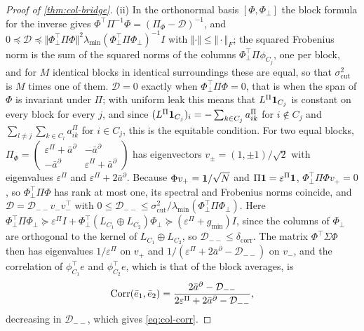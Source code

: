 \begin{proof}[Proof of \cref{thm:col-bridge}]
(ii) In the orthonormal basis $[\Phi,\Phi_\perp]$ the block formula for the inverse gives $\Phi^\top\Pi^{-1}\Phi=(\Pi_\Phi-\mathcal D)^{-1}$, and $0\preceq\mathcal D\preceq\Vert\Phi_\perp^\top\Pi\Phi\Vert^2\lambda_{\min}(\Phi_\perp^\top\Pi\Phi_\perp)^{-1}I$ with $\Vert\cdot\Vert\le\Vert\cdot\Vert_F$; the squared Frobenius norm is the sum of the squared norms of the columns $\Phi_\perp^\top\Pi\phi_{C_j}$, one per block, and for $M$ identical blocks in identical surroundings these are equal, so that $\sigma^2_{\mathrm{cut}}$ is $M$ times one of them. $\mathcal D=0$ exactly when $\Phi_\perp^\top\Pi\Phi=0$, that is when the span of $\Phi$ is invariant under $\Pi$; with uniform leak this means that $L^\Pi\mathbf{1}_{C_j}$ is constant on every block for every $j$, and since $(L^\Pi\mathbf{1}_{C_j})_i=-\sum_{k\in C_j}a^\Pi_{ik}$ for $i\notin C_j$ and $\sum_{l\neq j}\sum_{k\in C_l}a^\Pi_{ik}$ for $i\in C_j$, this is the equitable condition. For two equal blocks, $\Pi_\Phi=\begin{pmatrix}\varepsilon^\Pi+\bar a^\partial&-\bar a^\partial\\-\bar a^\partial&\varepsilon^\Pi+\bar a^\partial\end{pmatrix}$ has eigenvectors $v_\pm=(1,\pm1)/\sqrt2$ with eigenvalues $\varepsilon^\Pi$ and $\varepsilon^\Pi+2\bar a^\partial$. Because $\Phi v_+=\mathbf{1}/\sqrt N$ and $\Pi\mathbf{1}=\varepsilon^\Pi\mathbf{1}$, $\Phi_\perp^\top\Pi\Phi v_+=0$, so $\Phi_\perp^\top\Pi\Phi$ has rank at most one, its spectral and Frobenius norms coincide, and $\mathcal D=\mathcal D_{--}v_-v_-^\top$ with $0\le\mathcal D_{--}\le\sigma^2_{\mathrm{cut}}/\lambda_{\min}(\Phi_\perp^\top\Pi\Phi_\perp)$. Here $\Phi_\perp^\top\Pi\Phi_\perp\succeq\varepsilon^\Pi I+\Phi_\perp^\top(L_{C_1}\oplus L_{C_2})\Phi_\perp\succeq(\varepsilon^\Pi+g_{\min})I$, since the columns of $\Phi_\perp$ are orthogonal to the kernel of $L_{C_1}\oplus L_{C_2}$, so $\mathcal D_{--}\le\delta_{\mathrm{corr}}$. The matrix $\Phi^\top\Sigma\Phi$ then has eigenvalues $1/\varepsilon^\Pi$ on $v_+$ and $1/(\varepsilon^\Pi+2\bar a^\partial-\mathcal D_{--})$ on $v_-$, and the correlation of $\phi_{C_1}^\top e$ and $\phi_{C_2}^\top e$, which is that of the block averages, is
\[
\operatorname{Corr}(\bar e_1,\bar e_2)=\frac{2\bar a^\partial-\mathcal D_{--}}{2\varepsilon^\Pi+2\bar a^\partial-\mathcal D_{--}},
\]
decreasing in $\mathcal D_{--}$, which gives \eqref{eq:col-corr}.


\end{proof}
